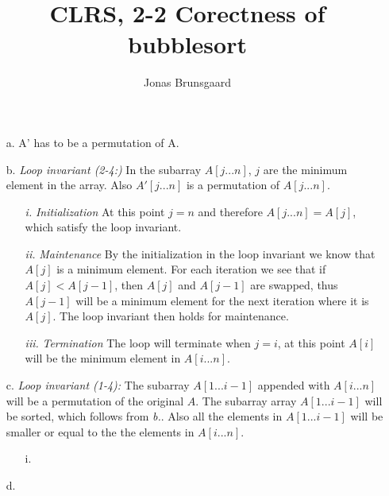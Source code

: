 \documentclass[11pt,a4paper]{article}
\title{CLRS, 2-2 Corectness of bubblesort}
\author{Jonas Brunsgaard}
\begin{document}
\maketitle

\begin{itemize}
    \item[a.] A' has to be a permutation of A.
    \item[b.] \textit{Loop invariant (2-4:)} In the subarray  $A[j...n]$, $j$ are the minimum element in the array. Also $A'[j...n]$ is a permutation of $A[j...n]$.
        \begin{itemize}
            \item[\textit{i.}] \textit{Initialization} At this point $j=n$ and therefore $A[j...n]=A[j]$, which satisfy the loop invariant.
            \item[\textit{ii.}] \textit{Maintenance} By the initialization in the loop invariant we know that $A[j]$ is a minimum element. 
                For each iteration we see that if $A[j] < A[j-1]$, then $A[j]$ and $A[j-1]$ are swapped, thus $A[j-1]$ will be a minimum element for the next
                iteration where it is $A[j]$. The loop invariant then holds for maintenance.
            \item[\textit{iii.}] \textit{Termination} The loop will terminate when $j=i$, at this point $A[i]$ will be the minimum element in $A[i...n]$.
        \end{itemize}
    \item[c.] \textit{Loop invariant (1-4):} The subarray $A[1...i-1]$ appended with $A[i...n]$ will be a permutation of the original $A$. The subarray array 
        $A[1...i-1]$ will be sorted, which follows from \textit{b.}. Also all the elements in $A[1...i-1]$ will be smaller or equal to the the elements in $A[i...n]$.
        \begin{itemize}
            \item[i.]
        \end{itemize}
    \item[d.]
\end{itemize}
\end{document}
